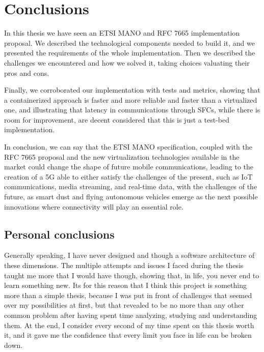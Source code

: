 \chapter{Conclusions}
\label{chap:conclusions}

In this thesis we have seen an ETSI MANO and RFC 7665 implementation proposal. 
We described the technological components needed to build it, and we presented 
the requirements of the whole implementation. Then we described the challenges 
we encountered and how we solved it, taking choices valuating their pros and 
cons.

Finally, we corroborated our implementation with tests and metrics, showing 
that a containerized approach is faster and more reliable and faster than a 
virtualized one, and illustrating that latency in communications through SFCs, 
while there is room for improvement, are decent considered that this is just 
a test-bed implementation.

In conclusion, we can say that the ETSI MANO specification, coupled with the 
RFC 7665 proposal and the new virtualization technologies available in the 
market could change the shape of future mobile communications, leading to the 
creation of a 5G able to either satisfy the challenges of the present, such as 
IoT communications, media streaming, and real-time data, with the challenges of 
the future, as smart dust and flying autonomous vehicles emerge as the next 
possible innovations where connectivity will play an essential role.

\section*{Personal conclusions}

Generally speaking, I have never designed and though a software architecture of
these dimensions. The multiple attempts and issues I faced during the thesis
taught me more that I would have though, showing that, in life, you never end to
learn something new. Its for this reason that I think this project is something
more than a simple thesis, because I was put in front of challenges that seemed
over my possibilities at first, but that revealed to be no more than any other
common problem after having spent time analyzing, studying and understanding
them. At the end, I consider every second of my time spent on this thesis worth
it, and it gave me the confidence that every limit you face in life can be
broken down.

